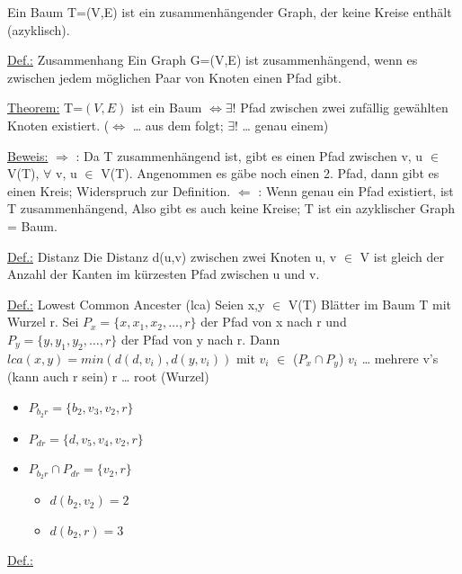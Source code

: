 Ein Baum T=(V,E) ist ein zusammenhängender Graph, der keine Kreise enthält (azyklisch).
\par\medskip
\underline{Def.:} Zusammenhang
\newline
Ein Graph G=(V,E) ist zusammenhängend, wenn es zwischen jedem möglichen Paar von Knoten einen Pfad gibt.
\par\medskip
\underline{Theorem:}
\newline
T=$\left(V,E\right)$ ist ein Baum $\Leftrightarrow \exists!$ Pfad zwischen zwei zufällig gewählten Knoten existiert.
($\Leftrightarrow$ … aus dem folgt; $\exists!$ … genau einem)
\par\medskip
\underline{Beweis:}
\newline
$\Rightarrow$ : Da T zusammenhängend ist, gibt es einen Pfad zwischen v, u $\in$ V(T), $\forall$ v, u $\in$ V(T).
Angenommen es gäbe noch einen 2. Pfad, dann gibt es einen Kreis; Widerspruch zur Definition.
\newline
$\Leftarrow$ : Wenn genau ein Pfad existiert, ist T zusammenhängend, Also gibt es auch keine Kreise; T ist ein azyklischer Graph = Baum.
\par\medskip
\underline{Def.:} Distanz
\newline
Die Distanz d(u,v) zwischen zwei Knoten u, v $\in$ V ist gleich der Anzahl der Kanten im kürzesten Pfad zwischen u und v.
\par\medskip
\underline{Def.:} Lowest Common Ancester (lca)
\newline
Seien x,y $\in$ V(T) Blätter im Baum T mit Wurzel r.
Sei $P_x = \{x, x_1 , x_2 , …, r\}$ der Pfad von x nach r und $P_y = \{y, y_1 , y_2 , …, r\}$ der Pfad von y nach r.
Dann $lca (x,y)=min(d(d,v_i), d(y,v_i))$ mit $v_i$ $\in$ ($P_x \cap P_y$)
\newline
$v_i$ … mehrere v's (kann auch r sein)
\newline
r … root (Wurzel)
\begin{itemize}
	\item $P_{{b_2}{r}} = \{b_2, v_3, v_2, r\}$
	\item $P_{dr} = \{d, v_5, v_4, v_2, r\}$
	\item $P_{{b_2}{r}} \cap P_{dr} = \{v_2, r\}$
	\begin{itemize}
		\item $d(b_2, v_2) = 2$
		\item $d(b_2, r) = 3$
	\end{itemize}
\end{itemize}
\underline{Def.:}

